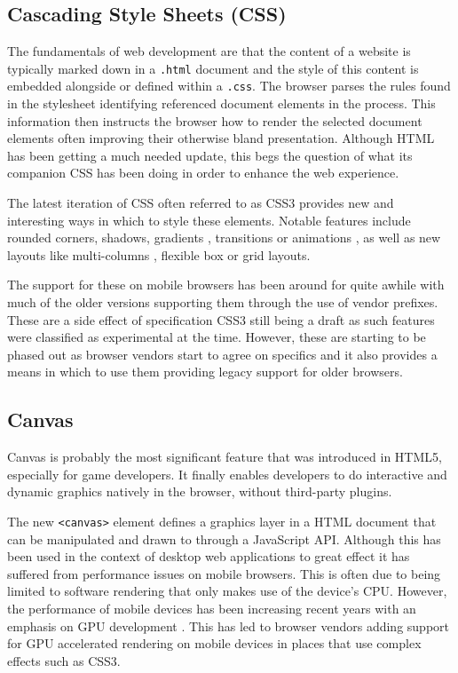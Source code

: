 \documentclass[final]{cmpreport}
\begin{document}
\subsection{Cascading Style Sheets (CSS)}
The fundamentals of web development are that the content of a website is typically marked down in a \texttt{.html} document and the style of this content is embedded alongside or defined within a \texttt{.css}. The browser parses the rules found in the stylesheet identifying referenced document elements in the process. This information then instructs the browser how to render the selected document elements often improving their otherwise bland presentation. Although HTML has been getting a much needed update, this begs the question of what its companion CSS has been doing in order to enhance the web experience. 

The latest iteration of CSS often referred to as CSS3 provides new and interesting ways in which to style these elements. Notable features include rounded corners, shadows, gradients , transitions or animations , as well as new layouts like multi-columns , flexible box or grid layouts\footnotemark.


The support for these on mobile browsers has been around for quite awhile with much of the older versions supporting them through the use of vendor prefixes. These are a side effect of specification CSS3 still being a draft as such features were classified as experimental at the time. However, these are starting to be phased out as browser vendors start to agree on specifics and it also provides a means in which to use them providing legacy support for older browsers.

\subsection{Canvas}
Canvas is probably the most significant feature that was introduced in HTML5, especially for game developers. It finally enables developers to do interactive and dynamic graphics natively in the browser, without third-party plugins.

The new \texttt{<canvas>} element defines a graphics layer in a HTML document that can be manipulated and drawn to through a JavaScript API. Although this has been used in the context of desktop web applications to great effect it has suffered from performance issues on mobile browsers. This is often due to being limited to software rendering that only makes use of the device's CPU. However, the performance of mobile devices has been increasing recent years with an emphasis on GPU development \cite{Lin}. This has led to browser vendors adding support for GPU accelerated rendering on mobile devices in places that use complex effects such as CSS3.
\end{document}
